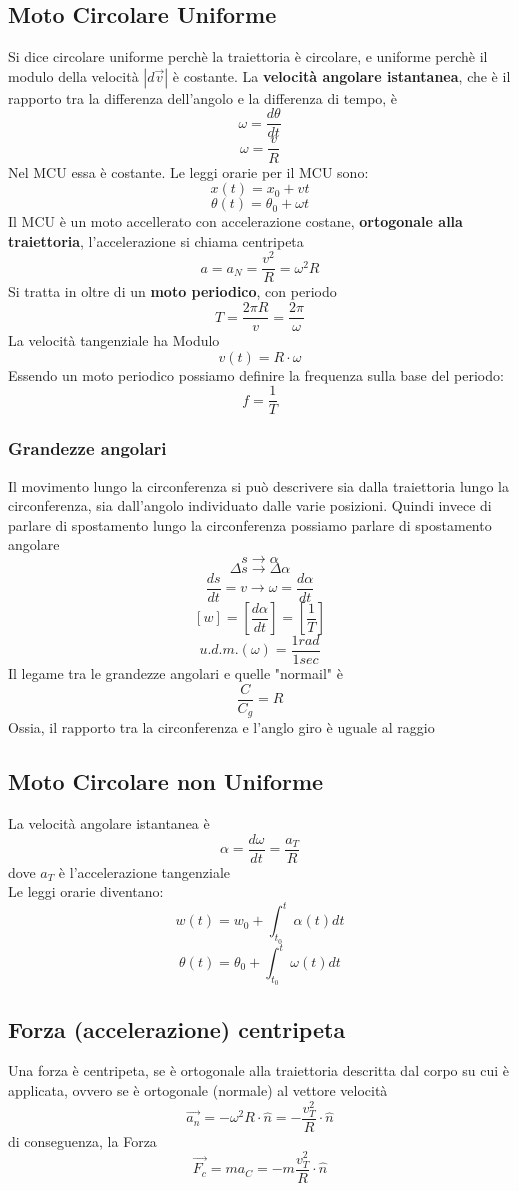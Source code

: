 \documentclass[a4paper]{report}
\begin{document}
  \subsection{Moto Circolare Uniforme}
  Si dice circolare uniforme perchè la traiettoria è circolare, e uniforme perchè il modulo della velocità $|d\vec{v}|$ è costante.
  La \textbf{velocità angolare istantanea}, che è il rapporto tra la differenza dell'angolo e la differenza di tempo, è
  $$ \omega = \frac{d\theta}{dt} $$
  $$ \omega = \frac{v}{R} $$
  Nel MCU essa è costante. Le leggi orarie per il MCU sono:
  $$ x(t) =x_0 + vt$$
  $$ \theta(t) = \theta_0 + \omega t$$
  Il MCU è un moto accellerato con accelerazione costane, \textbf{ortogonale alla traiettoria}, l'accelerazione si chiama centripeta
  $$ a= a_N = \frac{v^2}{R} = \omega^2 R$$
  Si tratta in oltre di un \textbf{moto periodico}, con periodo
  $$ T=\frac{2\pi R}{v} = \frac{2\pi}{\omega} $$
  La velocità tangenziale ha Modulo
  $$ v(t) = R \cdot \omega $$
  Essendo un moto periodico possiamo definire la frequenza sulla base del periodo:
  $$ f = \frac{1}{T}$$
  \subsubsection{Grandezze angolari}
  Il movimento lungo la circonferenza si può descrivere sia dalla traiettoria lungo la circonferenza, sia dall'angolo individuato dalle varie posizioni. Quindi invece di parlare di spostamento lungo la circonferenza possiamo parlare di spostamento angolare
  $$ s \rightarrow \alpha$$
  $$ \Delta s \rightarrow \Delta \alpha$$
  $$ \frac{ds}{dt} = v \rightarrow \omega = \frac{d\alpha}{dt}$$
  $$[w] = [\frac{d\alpha}{dt}] = [\frac{1}{T}]$$
  $$ u.d.m.(\omega) = \frac{1 rad}{1 sec}$$
  Il legame tra le grandezze angolari e quelle "normail" è
  $$\frac{C}{C_g} = R$$
  Ossia, il rapporto tra la circonferenza e l'anglo giro è uguale al raggio

  \subsection{Moto Circolare non Uniforme}
  La velocità angolare istantanea è
  $$ \alpha = \frac{d\omega}{dt} = \frac{a_T}{R} $$
  dove $a_T$ è l'accelerazione tangenziale\\
  Le leggi orarie diventano:
  $$ w(t) = w_0 + \int_{t_0}^t \alpha(t) dt $$
  $$ \theta(t) = \theta_0 + \int_{t_0}^t \omega(t) dt $$

  \subsection{Forza (accelerazione) centripeta}
  Una forza è centripeta, se è ortogonale alla traiettoria descritta dal corpo su cui è applicata, ovvero se è ortogonale (normale) al vettore velocità
  $$ \vec{a_n} = -\omega^2 R \cdot \hat{n} = -\frac{v_T^2}{R} \cdot \hat{n} $$
  di conseguenza, la Forza
  $$ \vec{F_c} = ma_C =  -m\frac{v_T^2}{R} \cdot \hat{n}$$
\end{document}
